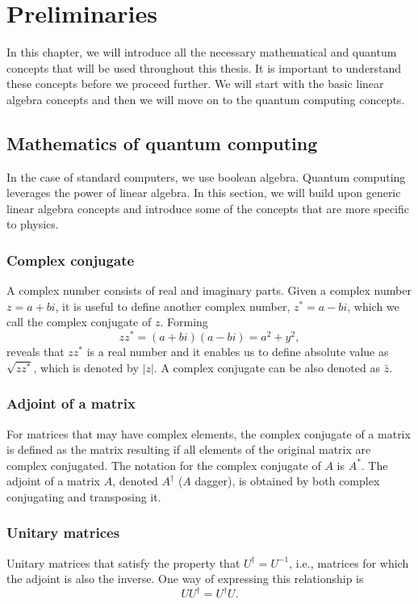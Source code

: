 \graphicspath{ {../images/}}

\chapter{Preliminaries}\label{ch:preliminaries}
In this chapter, we will introduce all the necessary mathematical and quantum concepts that will be used throughout this thesis. It is important to understand these concepts before we proceed further. We will start with the basic linear algebra concepts and then we will move on to the quantum computing concepts.
\section{Mathematics of quantum computing}
In the case of standard computers, we use boolean algebra. Quantum computing leverages the power of linear algebra. In this section, we will build upon generic linear algebra concepts and introduce some of the concepts that are more specific to physics. 

\subsection{Complex conjugate}
A complex number consists of real and imaginary parts. Given a complex number $z = a + bi$, it is useful to define another complex number, $z^{*} = a - bi$, which we call the complex conjugate of $z$. Forming
$$zz^{*} = (a + bi)(a - bi) = a^2 + y^2,$$ reveals that $zz^{*}$ is a real number and it enables us to define absolute value as $\sqrt{zz^{*}}$, which is denoted by $\lvert z \rvert$. A complex conjugate can be also denoted as $\bar{z}$.

\subsection{Adjoint of a matrix}
For matrices that may have complex elements, the complex conjugate of a matrix is defined as the matrix resulting if all elements of the original matrix are complex conjugated. The notation for the complex conjugate of $A$ is $A^*$. The adjoint of a matrix $A$, denoted $A^\dag$ ($A$ dagger), is obtained by both complex conjugating and transposing it.


\subsection{Unitary matrices}
Unitary matrices that satisfy the property that $U^\dag = U^{-1}$, i.e., matrices for which the adjoint is also the inverse. One way of expressing this relationship is 
$$U U^{\dag} = U^{\dag} U.$$

